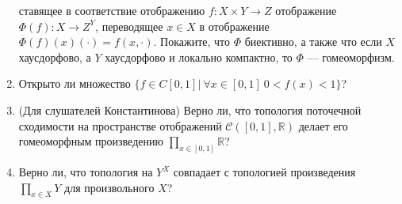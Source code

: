 \documentclass[a4paper]{article}
\begin{document}
\begin{enumerate}
	ставящее в соответствие отображению $f\colon X\times Y\to Z$ отображение $\Phi(f)\colon X\to Z^Y$, переводящее $x\in X$ в отображение $\Phi(f)(x)(\cdot)=f(x,\cdot)$. Покажите, что $\Phi$ биективно, а также что если $X$ хаусдорфово, а $Y$ хаусдорфово и локально компактно, то $\Phi$ --- гомеоморфизм.
	\item Открыто ли множество $\{f\in C[0,1]|\ \forall x\in[0,1]\ 0<f(x)<1\}$?
	\item (Для слушателей Константинова) Верно ли, что топология поточечной сходимости на пространстве отображений $\mathcal{C}([0,1],\mathbb{R})$ делает его гомеоморфным произведению $\prod\limits_{x\in[0,1]}\mathbb{R}$?
	\item Верно ли, что топология на $Y^X$ совпадает с топологией произведения $\prod\limits_{x\in X} Y$ для произвольного $X$?
\end{enumerate}
\end{document}
